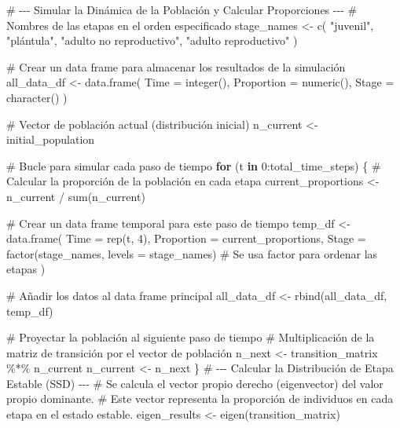 \documentclass[
  12pt,
  letterpaper,
]{book}
\newenvironment{Shaded}{\begin{snugshade}}{\end{snugshade}}
\newcommand{\AttributeTok}[1]{\textcolor[rgb]{0.40,0.45,0.13}{#1}}
\newcommand{\CommentTok}[1]{\textcolor[rgb]{0.37,0.37,0.37}{#1}}
\newcommand{\ControlFlowTok}[1]{\textcolor[rgb]{0.00,0.23,0.31}{\textbf{#1}}}
\newcommand{\DecValTok}[1]{\textcolor[rgb]{0.68,0.00,0.00}{#1}}
\newcommand{\FunctionTok}[1]{\textcolor[rgb]{0.28,0.35,0.67}{#1}}
\newcommand{\NormalTok}[1]{\textcolor[rgb]{0.00,0.23,0.31}{#1}}
\newcommand{\OtherTok}[1]{\textcolor[rgb]{0.00,0.23,0.31}{#1}}
\newcommand{\SpecialCharTok}[1]{\textcolor[rgb]{0.37,0.37,0.37}{#1}}
\newcommand{\StringTok}[1]{\textcolor[rgb]{0.13,0.47,0.30}{#1}}
\begin{document}
\begin{Shaded}
\begin{Highlighting}[]
\CommentTok{\# {-}{-}{-} Simular la Dinámica de la Población y Calcular Proporciones {-}{-}{-}}
\CommentTok{\# Nombres de las etapas en el orden especificado}
\NormalTok{stage\_names }\OtherTok{\textless{}{-}} \FunctionTok{c}\NormalTok{(}
  \StringTok{"juvenil"}\NormalTok{,}
  \StringTok{"plántula"}\NormalTok{,}
  \StringTok{"adulto no reproductivo"}\NormalTok{,}
  \StringTok{"adulto reproductivo"}
\NormalTok{)}

\CommentTok{\# Crear un data frame para almacenar los resultados de la simulación}
\NormalTok{all\_data\_df }\OtherTok{\textless{}{-}} \FunctionTok{data.frame}\NormalTok{(}
  \AttributeTok{Time =} \FunctionTok{integer}\NormalTok{(),}
  \AttributeTok{Proportion =} \FunctionTok{numeric}\NormalTok{(),}
  \AttributeTok{Stage =} \FunctionTok{character}\NormalTok{()}
\NormalTok{)}

\CommentTok{\# Vector de población actual (distribución inicial)}
\NormalTok{n\_current }\OtherTok{\textless{}{-}}\NormalTok{ initial\_population}

\CommentTok{\# Bucle para simular cada paso de tiempo}
\ControlFlowTok{for}\NormalTok{ (t }\ControlFlowTok{in} \DecValTok{0}\SpecialCharTok{:}\NormalTok{total\_time\_steps) \{}
  \CommentTok{\# Calcular la proporción de la población en cada etapa}
\NormalTok{  current\_proportions }\OtherTok{\textless{}{-}}\NormalTok{ n\_current }\SpecialCharTok{/} \FunctionTok{sum}\NormalTok{(n\_current)}

  \CommentTok{\# Crear un data frame temporal para este paso de tiempo}
\NormalTok{  temp\_df }\OtherTok{\textless{}{-}} \FunctionTok{data.frame}\NormalTok{(}
    \AttributeTok{Time =} \FunctionTok{rep}\NormalTok{(t, }\DecValTok{4}\NormalTok{),}
    \AttributeTok{Proportion =}\NormalTok{ current\_proportions,}
    \AttributeTok{Stage =} \FunctionTok{factor}\NormalTok{(stage\_names, }\AttributeTok{levels =}\NormalTok{ stage\_names) }\CommentTok{\# Se usa factor para ordenar las etapas}
\NormalTok{  )}

  \CommentTok{\# Añadir los datos al data frame principal}
\NormalTok{  all\_data\_df }\OtherTok{\textless{}{-}} \FunctionTok{rbind}\NormalTok{(all\_data\_df, temp\_df)}

  \CommentTok{\# Proyectar la población al siguiente paso de tiempo}
  \CommentTok{\# Multiplicación de la matriz de transición por el vector de población}
\NormalTok{  n\_next }\OtherTok{\textless{}{-}}\NormalTok{ transition\_matrix }\SpecialCharTok{\%*\%}\NormalTok{ n\_current}
\NormalTok{  n\_current }\OtherTok{\textless{}{-}}\NormalTok{ n\_next}
\NormalTok{\}}
\CommentTok{\# {-}{-}{-} Calcular la Distribución de Etapa Estable (SSD) {-}{-}{-}}
\CommentTok{\# Se calcula el vector propio derecho (eigenvector) del valor propio dominante.}
\CommentTok{\# Este vector representa la proporción de individuos en cada etapa en el estado estable.}
\NormalTok{eigen\_results }\OtherTok{\textless{}{-}} \FunctionTok{eigen}\NormalTok{(transition\_matrix)}


\end{Highlighting}
\end{Shaded}
\end{document}
